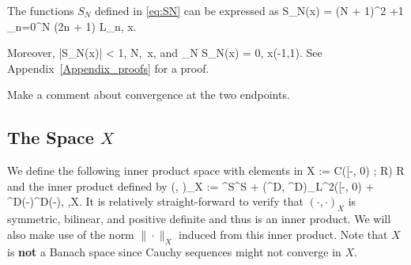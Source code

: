 \bl \label{Lemma_S_N}
The functions \(S_N\) defined in \eqref{eq:SN} can be expressed as
\be
S_N(x) =  {(N + 1)^2 +1} \sum_{n=0}^N (2n + 1) L_n, \quad x\in[-1,1].
\ee

Moreover,
\be\label{eq:uniform-bdd}
    |S_N(x)| < 1, \quad \forall N\in\Nzero,\ \forall x\in[-1,1],
\ee
and
\be\label{eq:pw-conv}
    \lim_{N\to\infty} S_N(x) = 0, \quad \forall x\in(-1,1).
\ee
\el
See Appendix~\ref{Appendix_proofs} for a proof.

\br
{\alert Make a comment about convergence at the two endpoints.}
\er


\subsection{The Space \(X\)}

We define the following inner product space with elements in 
\be
    X := \mathcal C([-\tau, 0) ; \mathbb R) \times \mathbb R
\ee
and the inner product defined by
\be
    (\Phi, \Psi)_X := \Phi^S\Psi^S +  \tau (\Phi^D, \Psi^D)_{L^2([-\tau, 0)} + \Phi^D(-\tau)\Psi^D(-\tau), \quad \Phi,\Psi\in X.
\ee
It is relatively straight-forward to verify that \((\cdot, \cdot)_X\) is symmetric, bilinear, and positive definite and thus is an inner product. We will also make use of the norm \(\|\cdot\|_X\) induced from this inner product. Note that \(X\) is \textbf{not} a Banach space since Cauchy sequences might not converge in \(X\).